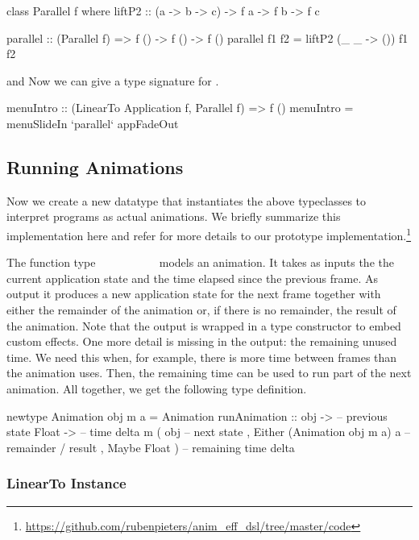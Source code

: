\begin{code}
class Parallel f where
  liftP2 :: (a -> b -> c) -> f a -> f b -> f c

parallel :: (Parallel f) => f () -> f () -> f ()
parallel f1 f2 = liftP2 (\_ _ -> ()) f1 f2
\end{code}
 and
Now we can give a type signature for .
\begin{code}
menuIntro :: (LinearTo Application f, Parallel f) => f ()
menuIntro = menuSlideIn `parallel` appFadeOut
\end{code}

\subsection{Running Animations}

Now we create a new  datatype that instantiates the above
typeclasses to interpret \dsl{} programs as actual animations. We briefly
summarize this implementation here and refer for more details to
our prototype
implementation.\footnote{\url{https://github.com/rubenpieters/anim_eff_dsl/tree/master/code}}

The function type
~\hs{->}~~\hs{->}~~\hs{(}~~~~~
models an animation.
It takes as inputs the the current application state and the
time elapsed since the previous frame. As output it produces a new
application state for the next frame together with either the remainder of the animation or, if there is no remainder, the result of
the animation. Note that the output is wrapped in a type
constructor  to embed custom effects. 
One more detail is missing in the output: the remaining unused time. We need
this when, for example, there is more time between frames than the animation
uses.
Then, the remaining time
can be used to run part of the next animation. All together, we get
the following type definition.

\begin{code}
newtype Animation obj m a = Animation { runAnimation ::
    obj ->                           -- previous state
    Float ->                         -- time delta
    m ( obj                          -- next state
      , Either (Animation obj m a) a -- remainder / result
      , Maybe Float )}               -- remaining time delta
\end{code}

\subsubsection{LinearTo Instance}

